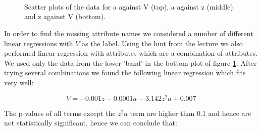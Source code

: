 \documentclass[a4]{article}
\begin{document}
\begin{figure}[H]
  \centering
  \\
  \\  
  \\
  \caption{Scatter plots of the data for a against V (top), a against z (middle) and z against V (bottom).}
  \label{fig:explore}
\end{figure}

In order to find the missing attribute names we considered a number of different linear regressions with $V$ as the label. Using the hint from the lecture we also performed linear regression with attributes which are a combination of attributes. We used only the data from the lower 'band' in the bottom plot of figure \ref{fig:explore}. After trying several combinations we found the following linear regression which fits very well:

\begin{equation*}
  V = -0.001z - 0.0001a - 3.142z^2a + 0.007
\end{equation*}

The p-values of all terms except the $z^2a$ term are higher than 0.1 and hence are not statistically significant, hence we can conclude that:
\end{document}
